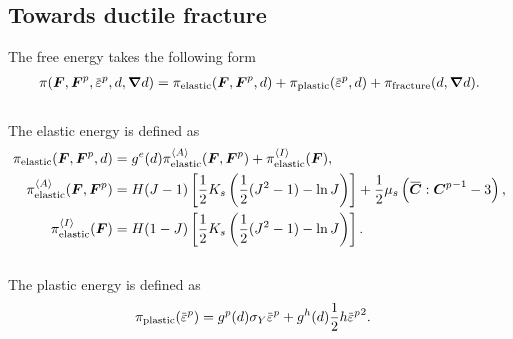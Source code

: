 \subsection{Towards ductile fracture}

\subsectioncover

\begin{frame}{}
The free energy takes the following form
\begin{align}
    \pi(\defgrad, \defgrad^p, \plasticstrain, d, \grad d) = \pi_\elastic(\defgrad, \defgrad^p, d) + \pi_\plastic(\plasticstrain, d) + \pi_\fracture(d, \grad d).
\end{align} \\
The elastic energy is defined as
\begin{subequations}
\begin{align}
    \pi_\elastic(\defgrad, \defgrad^p, d) &= g^e(d) \pi_\elastic^\activeenergy(\defgrad, \defgrad^p) + \pi_\elastic^\inactiveenergy(\defgrad), \\
    \pi_\elastic^\activeenergy(\defgrad, \defgrad^p) &= H(J-1) \left[ \dfrac{1}{2} K_s \left( \dfrac{1}{2} (J^2-1) - \ln{J} \right) \right] + \dfrac{1}{2} \mu_s \left( \overbar{\bs{C}} : {\bs{C}^p}^{-1} - 3 \right), \\
    \pi_\elastic^\inactiveenergy(\defgrad) &= H(1-J) \left[ \dfrac{1}{2} K_s \left( \dfrac{1}{2} (J^2-1) - \ln{J} \right) \right].
\end{align}
\end{subequations} \\
The plastic energy is defined as
\begin{align}
    \pi_\plastic(\plasticstrain) &= g^p(d) \sigma_Y \plasticstrain + g^h(d) \dfrac{1}{2} h \plasticstrain^2.
\end{align}
\end{frame}

